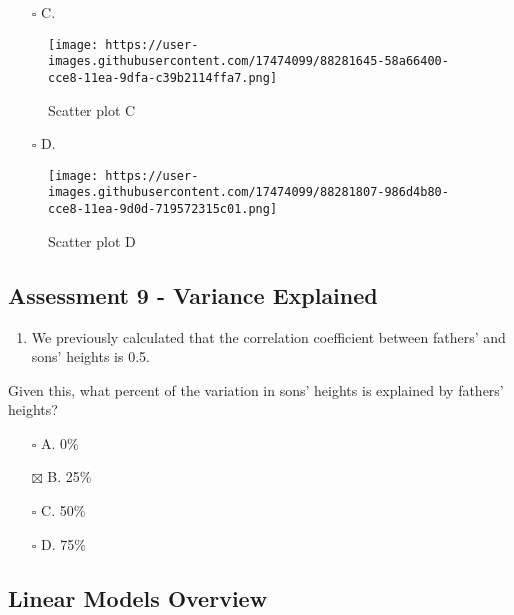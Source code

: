 \documentclass[
]{article}
\providecommand{\tightlist}{%
  \setlength{\itemsep}{0pt}\setlength{\parskip}{0pt}}
\begin{document}
\begin{itemize}
\tightlist
\item[$\square$]
  C.
\end{itemize}

\begin{figure}
\centering
\texttt{[image: https://user-images.githubusercontent.com/17474099/88281645-58a66400-cce8-11ea-9dfa-c39b2114ffa7.png]}
\caption{Scatter plot C}
\end{figure}

\begin{itemize}
\tightlist
\item[$\square$]
  D.
\end{itemize}

\begin{figure}
\centering
\texttt{[image: https://user-images.githubusercontent.com/17474099/88281807-986d4b80-cce8-11ea-9d0d-719572315c01.png]}
\caption{Scatter plot D}
\end{figure}

\hypertarget{assessment-9---variance-explained}{%
\subsection{Assessment 9 - Variance
Explained}\label{assessment-9---variance-explained}}

\begin{enumerate}
\def\labelenumi{\arabic{enumi}.}
\tightlist
\item
  We previously calculated that the correlation coefficient between
  fathers' and sons' heights is 0.5.
\end{enumerate}

Given this, what percent of the variation in sons' heights is explained
by fathers' heights?

\begin{itemize}
\tightlist
\item[$\square$]
  A. 0\%
\item[$\boxtimes$]
  B. 25\%
\item[$\square$]
  C. 50\%
\item[$\square$]
  D. 75\%
\end{itemize}

\hypertarget{linear-models-overview}{%
\subsection{Linear Models Overview}\label{linear-models-overview}}
\end{document}
